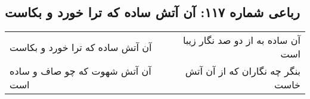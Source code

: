 \begin{center}
\section*{رباعی شماره ۱۱۷: آن آتش ساده که ترا خورد و بکاست}
\label{sec:0117}
\begin{longtable}{l p{0.5cm} r}
آن آتش ساده که ترا خورد و بکاست
&&
آن ساده به از دو صد نگار زیبا است
\\
آن آتش شهوت که چو صاف و ساده است
&&
بنگر چه نگاران که از آن آتش خاست
\\
\end{longtable}
\end{center}

